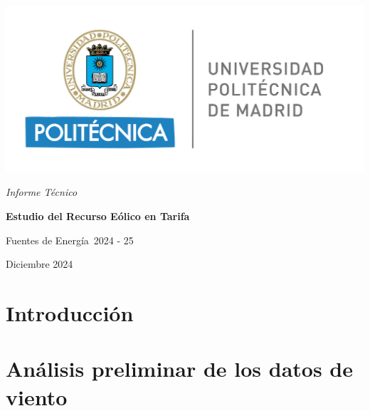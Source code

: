 \documentclass[12pt]{report}
\def\TituloProyecto{Estudio del Recurso Eólico en Tarifa}
\def\Asignatura{Fuentes de Energía}
\def\Curso{2024 - 25}
\def\Fecha{Diciembre 2024}
\begin{document}
\sloppy 
\setlength{\parindent}{30pt}
\setlength{\parskip}{6pt}
\renewcommand\thesection{\arabic{section}}
\renewcommand{\baselinestretch}{1.5}
\renewcommand{\listtablename}{Índice de tablas} %
\renewcommand{\tablename}{Tabla} %

\fancyhead{}
\fancyfoot{}
\pagestyle{fancy}
\chead[\rightmark]{\leftmark}

\fancyfoot[LE,RO]{\thepage}

\begin{titlepage}
    \centering
    \includegraphics[width=0.5\linewidth]{Imagenes/Logo UPM.png} \par
    \vspace{3 cm}
    {\itshape\huge Informe Técnico \par}
    \vspace{0.5cm}
    {\Huge \textbf{\TituloProyecto} \par}
    \vfill
    {\Large \Asignatura \  \Curso \par}
    \vspace{0.5cm}
    {\Large \Fecha \par}
\end{titlepage}

\tableofcontents
\pagebreak

\section{Introducción}

\section{Análisis preliminar de los datos de viento}
\end{document}

